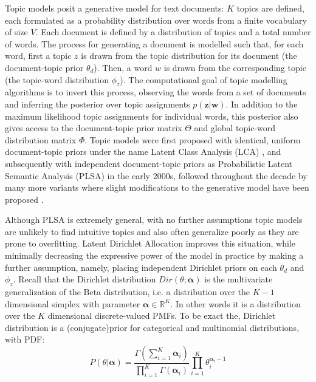Topic models posit a generative model for text documents: $K$ topics are defined, each formulated as a probability distribution over words from a finite vocabulary of size $V$. Each document is defined by a distribution of topics and a total number of words. The process for generating a document is modelled such that, for each word, first a topic $z$ is drawn from the topic distribution for its document (the document-topic prior $\theta_d$). Then, a word $w$ is drawn from the corresponding topic (the topic-word distribution $\phi_{z}$). The computational goal of topic modelling algorithms is to invert this process, observing the words from a set of documents and inferring the posterior over topic assignments $p(\boldsymbol{z} | \boldsymbol{w})$. In addition to the maximum likelihood topic assignments for individual words, this posterior also gives access to the document-topic prior matrix $\Theta$ and global topic-word distribution matrix $\Phi$. Topic models were first proposed with identical, uniform document-topic priors under the name Latent Class Analysis (LCA) \citep{Hofmann2000}, and subsequently with independent document-topic priors as Probabilistic Latent Semantic Analysis (PLSA) \citep{Hofmann2001} in the early 2000s, followed throughout the decade by many more variants where slight modifications to the generative model have been proposed \citep{Blei2010}.

Although PLSA is extremely general, with no further assumptions topic models are unlikely to find intuitive topics and also often generalize poorly as they are prone to overfitting.
Latent Dirichlet Allocation improves this situation, while minimally decreasing the expressive power of the model in practice by making a further assumption, namely, placing independent Dirichlet priors on each $\theta_d$ and $\phi_z$. Recall that the Dirichlet distribution $Dir(\theta; \boldsymbol{\alpha})$ is the multivariate generalization of the Beta distribution, i.e. a distribution over the $K-1$ dimensional simplex with parameter $\boldsymbol{\alpha} \in \mathbb{R}^K$. In other words it is a distribution over the $K$ dimensional discrete-valued PMFs. To be exact the, Dirichlet distribution is a (conjugate)prior for categorical and multinomial distributions, with PDF:
\begin{equation}
P(\theta|\boldsymbol{\alpha}) = \frac{\Gamma(\sum_{i=1}^{K} \boldsymbol{\alpha}_i)}{\prod_{i=1}^{K} \Gamma(\boldsymbol{\alpha}_i)} \prod_{i=1}^{K} \theta_i^{\boldsymbol{\alpha}_i -1}
\end{equation}

